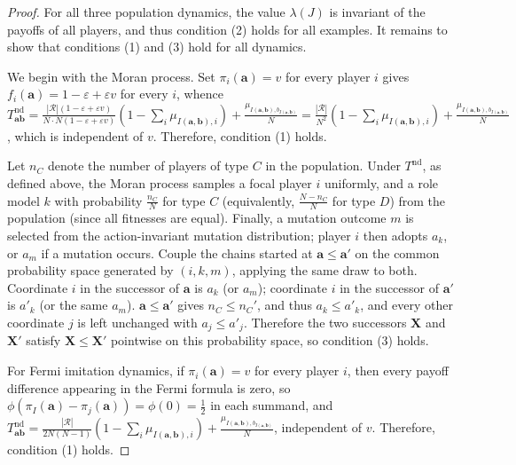 \documentclass{article}
\begin{document}
\begin{proof}

    For all three population dynamics, the value \(\lambda(J)\) is invariant of
    the payoffs of all players, and thus condition (2) holds for all examples.
    It remains to show that conditions (1) and (3) hold for all dynamics.

    We begin with the Moran process. Set \(\pi_i(\mathbf{a}) = v\) for every
    player \(i\) gives \(f_i(\mathbf{a}) = 1 -\varepsilon + \varepsilon v\) for every \(i\),
    whence \(T_{\mathbf{ab}}^{\mathrm{nd}} = \frac{|\mathcal{R}|(1-\varepsilon+\varepsilon
    v)}{N\cdot N (1-\varepsilon+\varepsilon v)}(1 - \sum_i \mu_{I(\mathbf{a,b}),
    i}) + \frac{\mu_{I(\mathbf{a,b}), b_{I(\mathbf{a,b})}}}{N} =
    \frac{|\mathcal{R}|}{N^2}(1 - \sum_i \mu_{I(\mathbf{a,b}), i}) +
    \frac{\mu_{I(\mathbf{a,b}), b_{I(\mathbf{a,b})}}}{N}\), which is independent
    of \(v\). Therefore, condition (1) holds.

    Let \(n_C\) denote the number of players of type \(C\) in the population.
    Under \(T^{\mathrm{nd}}\), as defined above, the Moran process samples a
    focal player \(i\) uniformly, and a role model \(k\) with probability
    \(\frac{n_C}{N}\) for type \(C\) (equivalently, \(\frac{N-n_C}{N}\) for type
    \(D\)) from the population (since all fitnesses are equal). Finally, a
    mutation outcome \(m\) is selected from the action-invariant mutation
    distribution; player \(i\) then adopts \(a_k\), or \(a_m\) if a mutation
    occurs. Couple the chains started at \(\mathbf{a} \leq \mathbf{a}'\) on the
    common probability space generated by \((i, k, m)\), applying the same draw
    to both. Coordinate \(i\) in the successor of \(\mathbf{a}\) is \(a_k\) (or
    \(a_m\)); coordinate \(i\) in the successor of \(\mathbf{a}'\) is \(a'_k\)
    (or the same \(a_m\)). \(\mathbf{a} \leq \mathbf{a}'\) gives \(n_C \leq
    n_C'\), and thus \(a_k \leq a'_k\), and every other coordinate \(j\) is left
    unchanged with \(a_j \leq a'_j\). Therefore the two successors
    \(\mathbf{X}\) and \(\mathbf{X}'\) satisfy \(\mathbf{X} \leq \mathbf{X}'\)
    pointwise on this probability space, so condition (3) holds.

    For Fermi imitation dynamics, if \(\pi_i(\mathbf{a}) = v\) for every player
    \(i\), then every payoff difference appearing in the Fermi formula is zero, so
    \(\phi(\pi_I(\mathbf{a}) - \pi_j(\mathbf{a})) = \phi(0) = \frac{1}{2}\) in
    each summand, and \(T_{\mathbf{ab}}^{\mathrm{nd}} = \frac{|\mathcal{R}|}{2N(N-1)}(1 -
    \sum_i \mu_{I(\mathbf{a,b}), i}) + \frac{\mu_{I(\mathbf{a,b}),
    b_{I(\mathbf{a,b})}}}{N}\), independent of \(v\). Therefore, condition (1)
    holds.


\end{proof}
\end{document}
